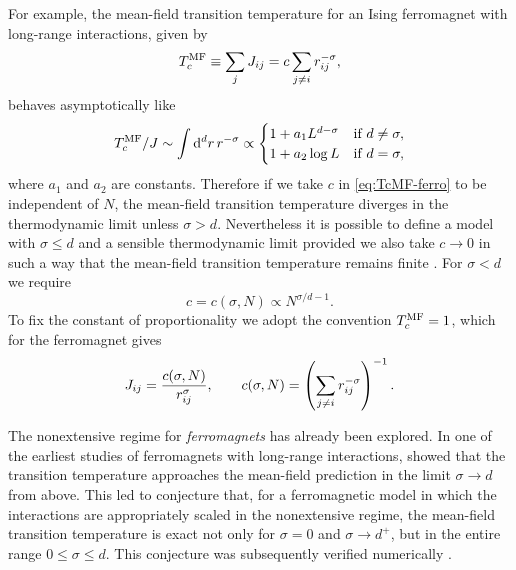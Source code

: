 For example, the mean-field transition temperature for an Ising ferromagnet
with long-range interactions, given by
\begin{equation}
  T_c^{\mathrm{MF}}
  \equiv \sum_j J_{ij}
  = c \sum_{j \neq i} r_{ij}^{-\sigma},
  \label{eq:TcMF-ferro}
\end{equation}
behaves asymptotically like
\begin{equation}
  T_c^{\mathrm{MF}}/J
  \sim \int \mathop{}\!\mathrm{d}^d r \, r^{-\sigma} \propto
  \begin{cases}
    1 + a_1 L^{d-\sigma} & \text{if } d \neq \sigma,\\
    1 + a_2 \log L       & \text{if } d = \sigma,
  \end{cases}
\end{equation}
where $a_1$ and $a_2$ are constants. Therefore if we take $c$ in
\cref{eq:TcMF-ferro} to be independent of $N$, the mean-field transition
temperature diverges in the thermodynamic limit unless $\sigma > d$.
Nevertheless it is possible to define a model with $\sigma \leq d$ and a
sensible thermodynamic limit provided we also take $c \to 0$ in such a way that
the mean-field transition temperature remains finite \autocite{cannas1996long}.
For $\sigma < d$ we require
\begin{equation}
  c = c(\sigma, N) \propto N^{\sigma/d - 1}.
\end{equation}
To fix the constant of proportionality we adopt the convention $T_c^{\mathrm{MF}}=1$, which
for the ferromagnet gives
\begin{equation}
  J_{ij} = \frac{c(\sigma, N)}{r_{ij}^{\sigma}},
  \qquad
  c(\sigma, N) = \left( \sum_{j \neq i} r_{ij}^{-\sigma} \right)^{-1}.
  \label{eq:J-scaling-ferro}
\end{equation}

The nonextensive regime for \emph{ferromagnets} has already been explored. In
one of the earliest studies
of ferromagnets with long-range interactions, \textcite{hiley1965ising} showed
that the transition temperature approaches the mean-field prediction in the
limit $\sigma \to d$ from above. This led \textcite{cannas1996long} to
conjecture that, for a ferromagnetic model in which the interactions are
appropriately scaled in the nonextensive regime, the mean-field transition
temperature is exact not only for $\sigma=0$ and $\sigma \to d^+$, but in the
entire range $0 \leq \sigma \leq d$. This conjecture was subsequently verified
numerically \autocite{cannas2000evidence,campa2000canonical}.

